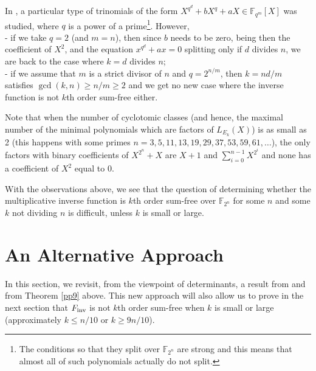 \documentclass{amsart}
\numberwithin{equation}{section}
\theoremstyle{definition}
\newcommand{\fin}{F_{\text{\rm inv}}}
\begin{document}
 In \cite{McGM}, a particular type of trinomials of the form $X^{q^d}+bX^q+aX\in \mathbb{F}_{q^m}[X]$ was studied, where $q$ is a power of a prime\footnote{The conditions so that they split over $\mathbb{F}_{2^n}$ are strong and this means that almost all of such polynomials actually do not split.}. However, 
\\- if we take $q=2$ (and $m=n$), then since $b$ needs to be zero, being then the coefficient of $X^2$, and the equation $x^{q^d}+ax=0$ splitting only if $d$ divides $n$, we are back to the case where $k=d$ divides $n$;%
\\- if we assume that $m$ is a strict divisor of $n$ and  $q=2^{n/m}$, then $k=nd/m$ satisfies $\gcd(k,n)\geq n/m\geq 2$ and we get no new case where the inverse function is not $k$th order sum-free either. 

Note that when the number of cyclotomic classes (and hence, the maximal number of the minimal polynomials which are factors of $L_{E_k}(X)$) is as small as 2 (this happens with some primes $n=3,5,11,13,19,29,37,53,59,61,\dots $), the only factors with binary coefficients of $X^{2^n}+X$ are $X+1$ and $\sum_{i=0}^{n-1}X^{2^i}$ and none has a coefficient of $X^2$ equal to 0. 

With the observations above, we see that the question of determining whether the multiplicative inverse function is $k$th order sum-free over $\mathbb{F}_{2^n}$ for some $n$ and some $k$ not dividing $n$ is difficult, unless $k$ is small or large.


\section{An Alternative Approach}

In this section, we revisit, from the viewpoint of determinants, a result from \cite[Corollary 2]{Carlet-0} and from Theorem \ref{pp9} above. This new approach will also allow us to prove in the next section that $\fin$ is not $k$th order sum-free when
$k$ is small or large (approximately $k\leq n/10$ or $k\geq 9n/10$).
\end{document}
